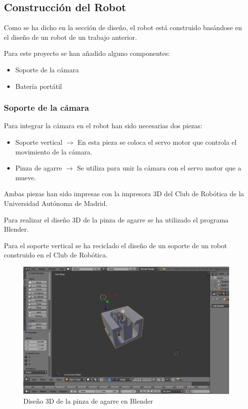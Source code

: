 \documentclass[twoside, 12pt]{epstfg}
\begin{document}
\subsection{Construcción del Robot}
Como se ha dicho en la sección de diseño, el robot está construido basándose en el diseño de un robot de un trabajo anterior.

Para este proyecto se han añadido alguno componentes:

\begin{itemize}
	\item Soporte de la cámara
	\item Batería portátil
\end{itemize}

\subsubsection{Soporte de la cámara}

Para integrar la cámara en el robot han sido necesarias dos piezas:

\begin{itemize}
	\item Soporte vertical $\rightarrow$ En esta pieza se coloca el servo motor que controla el movimiento de la cámara.
	
	\item Pinza de agarre $\rightarrow$ Se utiliza para unir la cámara con el servo motor que a mueve.
\end{itemize}

Ambas piezas han sido impresas con la impresora 3D del Club de Robótica de la Universidad Autónoma de Madrid.

Para realizar el diseño 3D de la pinza de agarre se ha utilizado el programa Blender.

Para el soporte vertical se ha reciclado el diseño de un soporte de un robot construido en el Club de Robótica.

\begin{figure}[h]
	\centerline{
		\mbox{\includegraphics[width=.80\textwidth]{images/cameraBlender.png}}
	}
	\caption{ Diseño 3D de la pinza de agarre en Blender}
\end{figure}
\end{document}
